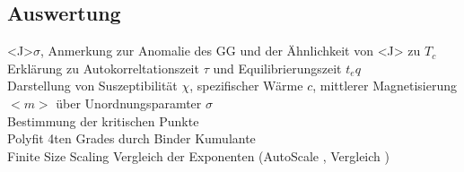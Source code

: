 \subsection{Auswertung}
    <J>\(\sigma\), Anmerkung zur Anomalie des GG und der Ähnlichkeit von <J> zu \(T_c\)\\

    Erklärung zu Autokorreltationszeit \(\tau\) und Equilibrierungszeit \(t_eq\)\\
    Darstellung von Suszeptibilität \(\chi\), spezifischer Wärme \(c\), mittlerer Magnetisierung \(<m>\) über Unordnungsparamter \(\sigma\)\\
    Bestimmung der kritischen Punkte\\
        Polyfit 4ten Grades durch Binder Kumulante \cite{Binder1981}\\
        Finite Size Scaling Vergleich der Exponenten (AutoScale \cite{Melchert2009}, Vergleich \cite[S. 59]{Pelissetto2002})\\
